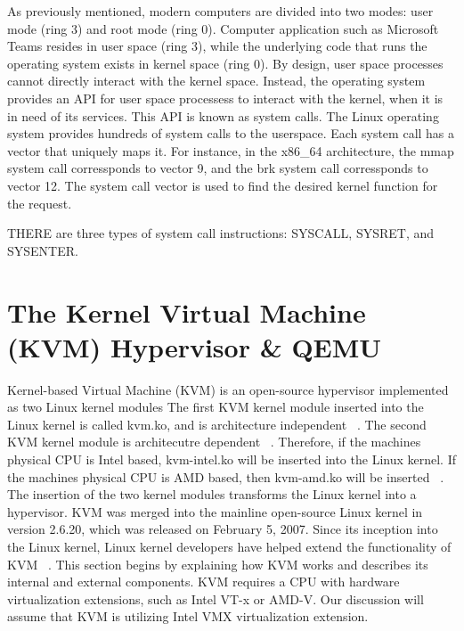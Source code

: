 \documentclass{report}
\begin{document}
\begin{spacing}{1.5}
{\large
As previously mentioned, modern computers are divided into two modes: user mode (ring 3) and root mode (ring 0). Computer application such as Microsoft Teams resides in user space (ring 3), while the underlying code that runs the operating system exists in kernel space (ring 0). By design, user space processes cannot directly interact with the kernel space. Instead, the operating system provides an API for user space processess to interact with the kernel, when it is in need of its services. This API is known as system calls. The Linux operating system provides hundreds of system calls to the userspace. Each system call has a vector that uniquely maps it. For instance, in the x86\_64 architecture, the mmap system call corressponds to vector 9, and the brk system call corressponds to vector 12. The system call vector is used to find the desired kernel function for the request. 



THERE are three types of system call instructions: SYSCALL, SYSRET, and SYSENTER. 
\newline
}
























\section{The Kernel Virtual Machine (KVM) Hypervisor \& QEMU}


{\large 
Kernel-based Virtual Machine (KVM) is an open-source hypervisor implemented as two Linux kernel modules The first KVM kernel module inserted into the Linux kernel is called kvm.ko, and is architecture independent ~\cite{chirammal2016mastering}. The second KVM kernel module is architecutre dependent ~\cite{chirammal2016mastering}. Therefore, if the machines physical CPU is Intel based, kvm-intel.ko will be inserted into the Linux kernel. If the machines physical CPU is AMD based, then kvm-amd.ko will be inserted ~\cite{chirammal2016mastering}. The insertion of the two kernel modules transforms the Linux kernel into a hypervisor. KVM was merged into the mainline open-source Linux kernel in version 2.6.20, which was released on February 5, 2007. Since its inception into the Linux kernel, Linux kernel developers have helped extend the functionality of KVM ~\cite{goto2011kernel}. This section begins by explaining how KVM works and describes its internal and external components. KVM requires a CPU with hardware virtualization extensions, such as Intel VT-x or AMD-V. Our discussion will assume that KVM is utilizing Intel VMX virtualization extension.
\newline
}



\end{spacing}
\end{document}
